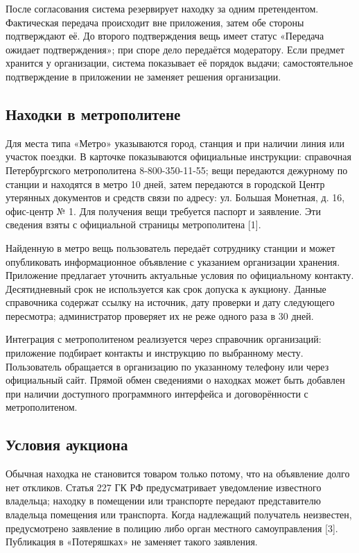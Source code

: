 После согласования система резервирует находку за одним претендентом. Фактическая передача происходит вне приложения, затем обе стороны подтверждают её. До второго подтверждения вещь имеет статус «Передача ожидает подтверждения»; при споре дело передаётся модератору. Если предмет хранится у организации, система показывает её порядок выдачи; самостоятельное подтверждение в приложении не заменяет решения организации.

\FloatBarrier
{}
\subsection{Находки в метрополитене}

Для места типа «Метро» указываются город, станция и при наличии линия или участок поездки. В карточке показываются официальные инструкции: справочная Петербургского метрополитена 8-800-350-11-55; вещи передаются дежурному по станции и находятся в метро 10 дней, затем передаются в городской Центр утерянных документов и средств связи по адресу: ул. Большая Монетная, д. 16, офис-центр № 1. Для получения вещи требуется паспорт и заявление. Эти сведения взяты с официальной страницы метрополитена [1].

Найденную в метро вещь пользователь передаёт сотруднику станции и может опубликовать информационное объявление с указанием организации хранения. Приложение предлагает уточнить актуальные условия по официальному контакту. Десятидневный срок не используется как срок допуска к аукциону. Данные справочника содержат ссылку на источник, дату проверки и дату следующего пересмотра; администратор проверяет их не реже одного раза в 30 дней.

Интеграция с метрополитеном реализуется через справочник организаций: приложение подбирает контакты и инструкцию по выбранному месту. Пользователь обращается в организацию по указанному телефону или через официальный сайт. Прямой обмен сведениями о находках может быть добавлен при наличии доступного программного интерфейса и договорённости с метрополитеном.

\FloatBarrier
{}
\subsection{Условия аукциона}

Обычная находка не становится товаром только потому, что на объявление долго нет откликов. Статья 227 ГК РФ предусматривает уведомление известного владельца; находку в помещении или транспорте передают представителю владельца помещения или транспорта. Когда надлежащий получатель неизвестен, предусмотрено заявление в полицию либо орган местного самоуправления [3]. Публикация в «Потеряшках» не заменяет такого заявления.

